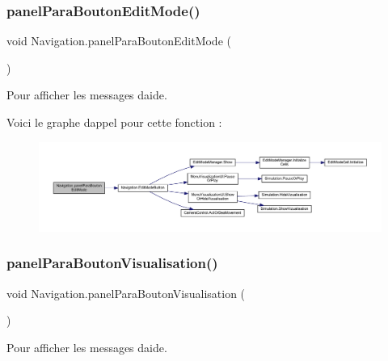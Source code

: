 \subsubsection{\texorpdfstring{panel\+Para\+Bouton\+Edit\+Mode()}{panelParaBoutonEditMode()}}
{\footnotesize\ttfamily void Navigation.\+panel\+Para\+Bouton\+Edit\+Mode (\begin{DoxyParamCaption}{ }\end{DoxyParamCaption})\hspace{0.3cm}{\ttfamily [inline]}}



Pour afficher les messages d\textquotesingle{}aide. 

Voici le graphe d\textquotesingle{}appel pour cette fonction \+:
\nopagebreak
\begin{figure}[H]
\begin{center}
\leavevmode
\includegraphics[width=350pt]{class_navigation_a9a7bb527269069e0c083ef70291d4fb3_cgraph}
\end{center}
\end{figure}
\mbox{\label{class_navigation_a70f344f826956e694febdfb6fb693af4}} 
\subsubsection{\texorpdfstring{panel\+Para\+Bouton\+Visualisation()}{panelParaBoutonVisualisation()}}
{\footnotesize\ttfamily void Navigation.\+panel\+Para\+Bouton\+Visualisation (\begin{DoxyParamCaption}{ }\end{DoxyParamCaption})\hspace{0.3cm}{\ttfamily [inline]}}



Pour afficher les messages d\textquotesingle{}aide. 

